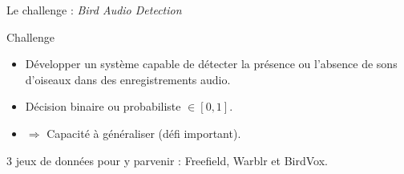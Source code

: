 \documentclass[compress,xcolor=table]{beamer}
\begin{document}







\begin{frame}{Le challenge : \textit{Bird Audio Detection}}

    \begin{block}{Challenge}
        \begin{itemize}
            \item Développer un système capable de détecter la présence ou l'absence de sons d'oiseaux dans des enregistrements audio.
            \item Décision binaire ou probabiliste $\in [0,1]$.
            \item $\Rightarrow$ Capacité à généraliser (défi important).
        \end{itemize}
    \end{block}

    3 jeux de données pour y parvenir : Freefield, Warblr et BirdVox.

\end{frame}
\end{document}

